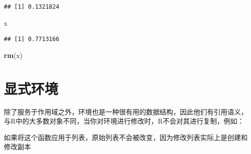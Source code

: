 \documentclass[]{book}
\newenvironment{Shaded}{\begin{snugshade}}{\end{snugshade}}
\newcommand{\KeywordTok}[1]{\textcolor[rgb]{0.13,0.29,0.53}{\textbf{#1}}}
\newcommand{\DecValTok}[1]{\textcolor[rgb]{0.00,0.00,0.81}{#1}}
\newcommand{\StringTok}[1]{\textcolor[rgb]{0.31,0.60,0.02}{#1}}
\newcommand{\ControlFlowTok}[1]{\textcolor[rgb]{0.13,0.29,0.53}{\textbf{#1}}}
\newcommand{\OperatorTok}[1]{\textcolor[rgb]{0.81,0.36,0.00}{\textbf{#1}}}
\newcommand{\NormalTok}[1]{#1}
\begin{document}
\begin{Shaded}
\end{Shaded}

\begin{verbatim}
## [1] 0.1321824
\end{verbatim}

\begin{Shaded}
\begin{Highlighting}[]
\NormalTok{x}
\end{Highlighting}
\end{Shaded}

\begin{verbatim}
## [1] 0.7713166
\end{verbatim}

\begin{Shaded}
\begin{Highlighting}[]
\KeywordTok{rm}\NormalTok{(x)}
\end{Highlighting}
\end{Shaded}

\section{显式环境}

除了服务于作用域之外，环境也是一种很有用的数据结构，因此他们有引用语义，与R中的大多数对象不同，当你对环境进行修改时，R不会对其进行复制，例如：

\begin{Shaded}
\end{Shaded}

如果将这个函数应用于列表，原始列表不会被改变，因为修改列表实际上是创建和修改副本

\begin{Shaded}
\end{Shaded}
\end{document}
